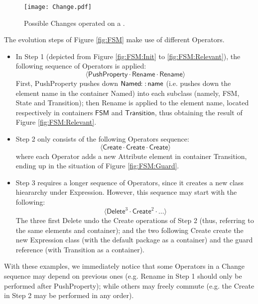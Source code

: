 \begin{figure}[t]
    \centering
    \texttt{[image: Change.pdf]}
    \caption{Possible \textsf{Change}s operated on a \metamodel.
        }
    \label{fig:Change}
\end{figure}

The evolution steps of Figure \ref{fig:FSM} make use of different \textsf{Operator}s.
\begin{itemize}
	\item In Step 1 (depicted from Figure \ref{fig:FSM:Init} to \ref{fig:FSM:Relevant}),
	the following sequence of \textsf{Operator}s is applied:
	$$\langle \mathsf{PushProperty} \cdot \mathsf{Rename} \cdot \mathsf{Rename} \rangle$$
	First, \textsf{PushProperty} pushes down $\mathsf{Named} \!\colon\!\colon\! \mathsf{name}$
	(i.e. pushes down the \textsf{element} \textsf{name} in the \textsf{container}
	\textsf{Named})
	into each subclass (namely, \textsf{FSM}, \textsf{State} and \textsf{Transition});
	then \textsf{Rename} is applied to the \textsf{element} \textsf{name}, 
	located respectively in \textsf{container}s $\mathsf{FSM}$ and 
	$\mathsf{Transition}$, thus obtaining the result of Figure \ref{fig:FSM:Relevant}.
	
	\item Step 2 only consists of the following \textsf{Operator}s sequence:
	$$\langle \mathsf{Create} \cdot \mathsf{Create} \cdot \mathsf{Create} \rangle$$
	where each \textsf{Operator} adds a new Attribute \textsf{element} in 
	\textsf{container} \textsf{Transition}, ending up in the situation of
	Figure \ref{fig:FSM:Guard}.
	
	\item Step 3 requires a longer sequence of \textsf{Operator}s, since it creates
	a new class hieararchy under \textsf{Expression}. However, this sequence may
	start with the following:
	$$\langle \mathsf{Delete}^3 \cdot \mathsf{Create}^2 \cdot \ldots \rangle$$
	The three first \textsf{Delete} undo the \textsf{Create} operations of Step 2
	(thus, referring to the same \textsf{element}s and \textsf{container}); and
	the two following \textsf{Create} create the new \textsf{Expression} class
	(with the default package as a \textsf{container}) and the \textsf{guard}
	reference (with \textsf{Transition} as a \textsf{container}).
\end{itemize}
With these examples, we immediately notice that some \textsf{Operator}s
in a \textsf{Change} sequence may depend on previous ones (e.g. \textsf{Rename}
in Step 1 should only be performed after \textsf{PushProperty}); while others
may freely commute (e.g. the \textsf{Create} in Step 2 may be performed in any 
order).